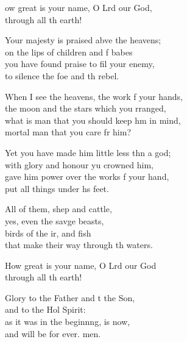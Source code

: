 \begin{psalmverse}
  \begin{patverse}

ow great is your name, O Lrd our God,\Med\\
through all th earth!

Your majesty is praised abve the heavens;\Med\\
on the lips of children and f babes\\
you have found praise to fil your enemy,\Med\\
to silence the foe and th rebel.

When I see the heavens, the work f your hands,\Med\\
the moon and the stars which you rranged,\\
what is man that you should keep h\pointup{\i}m in mind,\Med\\
mortal man that you care fr him?

Yet you have made him little less thn a god;\Med\\
with glory and honour yu crowned him,\\
gave him power over the works f your hand,\Med\\
put all things under h\pointup{\i}s feet.

All of them, shep and cattle,\Med\\
yes, even the savge beasts,\\
birds of the ir, and fish\Med\\
that make their way through th waters.

How great is your name, O Lrd our God\\
through all th earth!

Glory to the Father and t the Son,\Med\\
and to the Hol Spirit:\\
as it was in the beginn\pointup{\i}ng, is now,\Med\\
and will be for ever. men.
  \end{patverse}
  \end{psalmverse}
